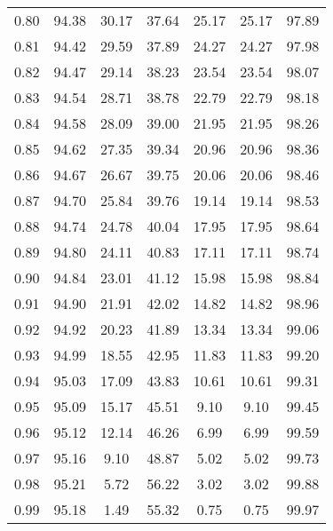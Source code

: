 \begin{tabular}{|c|c|c|c|c|c|c|}
      0.80 &     94.38 &     30.17 &      37.64 &   25.17 &      25.17 &         97.89 \\
      0.81 &     94.42 &     29.59 &      37.89 &   24.27 &      24.27 &         97.98 \\
      0.82 &     94.47 &     29.14 &      38.23 &   23.54 &      23.54 &         98.07 \\
      0.83 &     94.54 &     28.71 &      38.78 &   22.79 &      22.79 &         98.18 \\
      0.84 &     94.58 &     28.09 &      39.00 &   21.95 &      21.95 &         98.26 \\
      0.85 &     94.62 &     27.35 &      39.34 &   20.96 &      20.96 &         98.36 \\
      0.86 &     94.67 &     26.67 &      39.75 &   20.06 &      20.06 &         98.46 \\
      0.87 &     94.70 &     25.84 &      39.76 &   19.14 &      19.14 &         98.53 \\
      0.88 &     94.74 &     24.78 &      40.04 &   17.95 &      17.95 &         98.64 \\
      0.89 &     94.80 &     24.11 &      40.83 &   17.11 &      17.11 &         98.74 \\
      0.90 &     94.84 &     23.01 &      41.12 &   15.98 &      15.98 &         98.84 \\
      0.91 &     94.90 &     21.91 &      42.02 &   14.82 &      14.82 &         98.96 \\
      0.92 &     94.92 &     20.23 &      41.89 &   13.34 &      13.34 &         99.06 \\
      0.93 &     94.99 &     18.55 &      42.95 &   11.83 &      11.83 &         99.20 \\
      0.94 &     95.03 &     17.09 &      43.83 &   10.61 &      10.61 &         99.31 \\
      0.95 &     95.09 &     15.17 &      45.51 &    9.10 &       9.10 &         99.45 \\
      0.96 &     95.12 &     12.14 &      46.26 &    6.99 &       6.99 &         99.59 \\
      0.97 &     95.16 &      9.10 &      48.87 &    5.02 &       5.02 &         99.73 \\
      0.98 &     95.21 &      5.72 &      56.22 &    3.02 &       3.02 &         99.88 \\
      0.99 &     95.18 &      1.49 &      55.32 &    0.75 &       0.75 &         99.97 \\
\bottomrule
\end{tabular}
